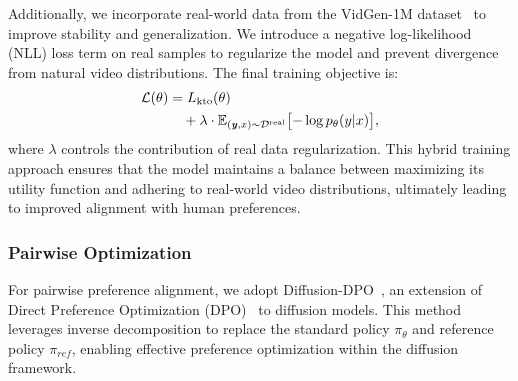 Additionally, we incorporate real-world data from the VidGen-1M dataset~\cite{tan2024vidgen1mlargescaledatasettexttovideo} to improve stability and generalization. We introduce a negative log-likelihood (NLL) loss term on real samples to regularize the model and prevent divergence from natural video distributions. The final training objective is:
\small
\begin{equation}
\begin{aligned}
\mathcal{L}(\theta) &= L_{\text{kto}}(\theta) \\
&\quad + \lambda \cdot \mathbb{E}_{(\textbf{\textit{y}}, x) \sim \mathcal{D}^{\mathrm{real}}} \bigl[-\log p_{\theta}(y|x)\bigr],
\end{aligned}
\end{equation}
\normalsize
where $\lambda$ controls the contribution of real data regularization. This hybrid training approach ensures that the model maintains a balance between maximizing its utility function and adhering to real-world video distributions, ultimately leading to improved alignment with human preferences.


\subsubsection{Pairwise Optimization}

For pairwise preference alignment, we adopt Diffusion-DPO~\cite{wallace2023diffusionmodelalignmentusing}, an extension of Direct Preference Optimization (DPO)~\cite{rafailov2024directpreferenceoptimizationlanguage} to diffusion models. This method leverages inverse decomposition to replace the standard policy $\pi_\theta$ and reference policy $\pi_{ref}$, enabling effective preference optimization within the diffusion framework.

